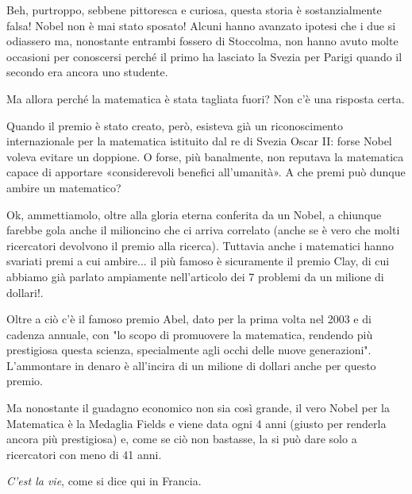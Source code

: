 Beh, purtroppo, sebbene pittoresca e curiosa, questa storia è sostanzialmente falsa! Nobel non è mai stato sposato! Alcuni hanno avanzato ipotesi che i due si odiassero ma, nonostante entrambi fossero di Stoccolma, non hanno avuto molte occasioni per conoscersi perché il primo ha lasciato la Svezia per Parigi quando il secondo era ancora uno studente.

Ma allora perché la matematica è stata tagliata fuori? Non c’è una risposta certa.

Quando il premio è stato creato, però, esisteva già un riconoscimento internazionale per la matematica istituito dal re di Svezia Oscar II: forse Nobel voleva evitare un doppione. O forse, più banalmente, non reputava la matematica capace di apportare «considerevoli benefici all’umanità».
A che premi può dunque ambire un matematico?

Ok, ammettiamolo, oltre alla gloria eterna conferita da un Nobel, a chiunque farebbe gola anche il milioncino che ci arriva correlato (anche se è vero che molti ricercatori devolvono il premio alla ricerca). Tuttavia anche i matematici hanno svariati premi a cui ambire... il più famoso è sicuramente il premio Clay, di cui abbiamo già parlato ampiamente nell'articolo dei 7 problemi da un milione di dollari!.

Oltre a ciò c'è il famoso premio Abel, dato per la prima volta nel 2003 e di cadenza annuale, con "lo scopo di promuovere la matematica, rendendo più prestigiosa questa scienza, specialmente agli occhi delle nuove generazioni". L'ammontare in denaro è all'incira di un milione di dollari anche per questo premio.

Ma nonostante il guadagno economico non sia così grande, il vero Nobel per la Matematica è la Medaglia Fields e viene data ogni 4 anni (giusto per renderla ancora più prestigiosa) e, come se ciò non bastasse, la si può dare solo a ricercatori con meno di 41 anni.

\textit{C'est la vie}, come si dice qui in Francia.